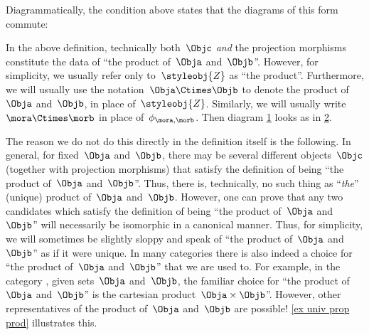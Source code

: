 \begin{remark}\label{re:prod-comm-diag}
  Diagrammatically, the condition above states that the diagrams of this form commute:
  \begin{figure}[h!]
    \begin{center}
    \end{center}
    \caption{\label{fig:prod-def-diagram}}
  \end{figure}
\end{remark}

\begin{remark}
  \label{prod unique up to iso}
  In the above definition, technically both~$\Objc$ \emph{and} the projection morphisms constitute the data of ``the product of~$\Obja$ and~$\Objb$''.
  However, for simplicity, we usually refer only to~$\styleobj{Z}$ as ``the product''.
  Furthermore, we will usually use the notation~$\Obja \Ctimes \Objb$ to denote the product of~$\Obja$ and~$\Objb$, in place of~$\styleobj{Z}$.
  Similarly, we will usually write~$\mora \Ctimes \morb$ in place of~$\phi_{\mora, \morb}$. Then diagram \cref{fig:prod-def-diagram} looks as in \cref{fig:prod-def-diagram-generic}.
  \begin{figure}[h!]
  \begin{center}
\end{center}
    \caption{\label{fig:prod-def-diagram-generic}}
  \end{figure}

The reason we do not do this directly in the definition itself is the following.
In general, for fixed~$\Obja$ and~$\Objb$, there may be several different objects~$\Objc$ (together with projection morphisms) that satisfy the definition of being ``the product of~$\Obja$ and~$\Objb$''.
  Thus, there is, technically, no such thing as ``\emph{the}'' (unique) product of~$\Obja$ and~$\Objb$.
  However, one can prove that any two candidates which satisfy the definition of being ``the product of~$\Obja$ and~$\Objb$'' will necessarily be isomorphic in a canonical manner.
  Thus, for simplicity, we will sometimes be slightly sloppy and speak of ``the product of~$\Obja$ and~$\Objb$'' as if it were unique.
  In many categories there is also indeed a choice for ``the product of~$\Obja$ and~$\Objb$'' that we are used to.
  For example, in the category \Set, given sets~$\Obja$ and~$\Objb$, the familiar choice for ``the product of~$\Obja$ and~$\Objb$'' is the cartesian product~$\Obja \times \Objb$''.
  However, other representatives of the product of~$\Obja$ and~$\Objb$ are possible! \cref{ex univ prop prod} illustrates this.
\end{remark}

